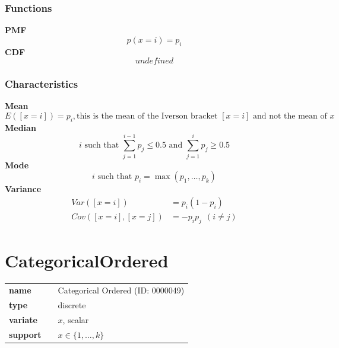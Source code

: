 \subsubsection*{Functions}

\smallskip \noindent \hspace{.2cm} \textbf{PMF} 
\begin{equation*}p(x=i)=p_i\end{equation*}
\smallskip \noindent \hspace{.2cm} \textbf{CDF} 
\begin{equation*}undefined\end{equation*}
\smallskip
\subsubsection*{Characteristics}
\smallskip \noindent \hspace{.2cm} \textbf{Mean} 
\begin{equation*}E([x=i]) = p_i, \text{this is the mean of the Iverson bracket } [x=i] \text{ and not the mean of } x\end{equation*}
\smallskip \noindent \hspace{.2cm} \textbf{Median} 
\begin{equation*}i\text{ such that }\sum_{j=1}^{i-1} p_j \leq 0.5\text{ and }\sum_{j=1}^{i} p_j \geq 0.5\end{equation*}
\smallskip \noindent \hspace{.2cm} \textbf{Mode} 
\begin{equation*}i\text{ such that }p_i=\max(p_1, \ldots, p_k)\end{equation*}
\smallskip \noindent \hspace{.2cm} \textbf{Variance} 
\begin{align*}
Var([x=i]) &= p_i (1-p_i) \\ 
Cov([x=i],[x=j]) &= - p_i p_j~~(i\neq j)\end{align*}
\smallskip
\section*{CategoricalOrdered} 

  \bigskip 

\begin{tabular}{p{2cm}cl}
\textbf{name} & & Categorical Ordered (ID: 0000049)\\ 
 
\textbf{type} & & discrete \\ 

\textbf{variate} & & $x$, scalar \\ 

\textbf{support} & & $x \in \{1,\dots,k\}$
\end{tabular}

